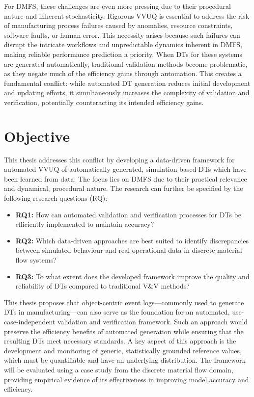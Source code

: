 For DMFS, these challenges are even more pressing due to their procedural nature and inherent stochasticity. Rigorous VVUQ is essential to address the risk of manufacturing process failures caused by anomalies, resource constraints, software faults, or human error. This necessity arises because such failures can disrupt the intricate workflows and unpredictable dynamics inherent in DMFS, making reliable performance prediction a priority. When DTs for these systems are generated automatically, traditional validation methods become problematic, as they negate much of the efficiency gains through automation. This creates a fundamental conflict: while automated DT generation reduces initial development and updating efforts, it simultaneously increases the complexity of validation and verification, potentially counteracting its intended efficiency gains.

\section{Objective}

This thesis addresses this conflict by developing a data-driven framework for automated VVUQ of automatically generated, simulation-based DTs which have been learned from data. The focus lies on DMFS due to their practical relevance and dynamical, procedural nature. The research can further be specified by the following research questions (RQ):

\begin{itemize}
  \label{par:rq1}
  \item \textbf{RQ1:} How can automated validation and verification processes for DTs be efficiently implemented to maintain accuracy?
        \label{par:rq2}
  \item \textbf{RQ2:} Which data-driven approaches are best suited to identify discrepancies between simulated behaviour and real operational data in discrete material flow systems?
        \label{par:rq3}
  \item \textbf{RQ3:} To what extent does the developed framework improve the quality and reliability of DTs compared to traditional V&V methods?
\end{itemize}

This thesis proposes that object-centric event logs—commonly used to generate DTs in manufacturing—can also serve as the foundation for an automated, use-case-independent validation and verification framework. Such an approach would preserve the efficiency benefits of automated generation while ensuring that the resulting DTs meet necessary standards. A key aspect of this approach is the development and monitoring of generic, statistically grounded reference values, which must be quantifiable and have an underlying distribution. The framework will be evaluated using a case study from the discrete material flow domain, providing empirical evidence of its effectiveness in improving model accuracy and efficiency.

